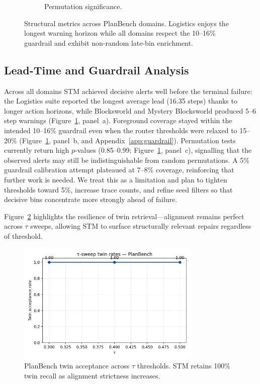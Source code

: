 \documentclass[11pt]{article}
\begin{document}
\begin{figure}[h]
\begin{subfigure}[t]{0.32\textwidth}
    \caption{Permutation significance.}
  \end{subfigure}
  \caption{Structural metrics across PlanBench domains. Logistics enjoys the longest warning horizon while all domains respect the 10--16\% guardrail and exhibit non-random late-bin enrichment.}
  \label{fig:planbench-metrics}
\end{figure}

\subsection{Lead-Time and Guardrail Analysis}
Across all domains STM achieved decisive alerts well before the terminal failure: the Logistics suite reported the longest average lead (16.35 steps) thanks to longer action horizons, while Blocksworld and Mystery Blocksworld produced 5--6 step warnings (Figure~\ref{fig:planbench-metrics}, panel~a). Foreground coverage stayed within the intended 10--16\% guardrail even when the router thresholds were relaxed to 15--20\% (Figure~\ref{fig:planbench-metrics}, panel~b, and Appendix~\ref{app:guardrail}). Permutation tests currently return high $p$-values (0.85--0.99; Figure~\ref{fig:planbench-metrics}, panel~c), signalling that the observed alerts may still be indistinguishable from random permutations. A 5\% guardrail calibration attempt plateaued at 7--8\% coverage, reinforcing that further work is needed. We treat this as a limitation and plan to tighten thresholds toward 5\%, increase trace counts, and refine seed filters so that decisive bins concentrate more strongly ahead of failure.

Figure~\ref{fig:tau-planbench} highlights the resilience of twin retrieval---alignment remains perfect across \(\tau\) sweeps, allowing STM to surface structurally relevant repairs regardless of threshold.

\begin{figure}[h]
  \centering
  \includegraphics[width=0.78\textwidth]{../note/fig_tau_sweep_planbench.png}
  \caption{PlanBench twin acceptance across \(\tau\) thresholds. STM retains 100\% twin recall as alignment strictness increases.}
  \label{fig:tau-planbench}
\end{figure}
\end{document}
